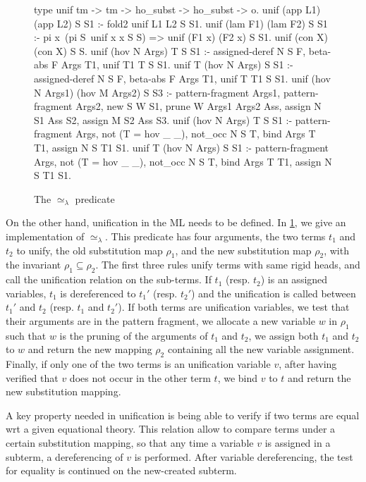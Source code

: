 \documentclass[sigconf,natbib=false]{acmart}
\newcommand{\UnifRel}{\ensuremath{\simeq}}
\newcommand{\Ue}{\ensuremath{\UnifRel_\lambda}\xspace}
\begin{document}
\begin{figure}
  \begin{elpicode}
    type unif tm -> tm -> ho_subst -> ho_subst ->  o.
    unif (app L1) (app L2) S S1 :- fold2 unif L1 L2 S S1.
    unif (lam F1) (lam F2) S S1 :- 
      pi x\ (pi S\ unif x x S S) => unif (F1 x) (F2 x) S S1.
    unif (con X) (con X) S S.
    unif (hov N Args) T S S1 :- 
      assigned-deref N S F, beta-abs F Args T1, unif T1 T S S1.
    unif T (hov N Args) S S1 :- 
      assigned-deref N S F, beta-abs F Args T1, unif T T1 S S1.
    unif (hov N Args1) (hov M Args2) S S3 :-  
      pattern-fragment Args1, pattern-fragment Args2, 
      new S W S1, prune W Args1 Args2 Ass, 
      assign N S1 Ass S2, assign M S2 Ass S3.
    unif (hov N Args) T S S1 :- pattern-fragment Args,
      not (T = hov _ _), not_occ N S T,  
      bind Args T T1, assign N S T1 S1.
    unif T (hov N Args) S S1 :- pattern-fragment Args,
      not (T = hov _ _), not_occ N S T, 
       bind Args T T1, assign N S T1 S1.
  \end{elpicode}
  \caption{The \Ue predicate}
  \label{code:ue-pred}
\end{figure}

On the other hand, unification in the ML needs to be defined. In
\cref{code:ue-pred}, we give an implementation of \Ue. This predicate has four
arguments, the two terms $t_1$ and $t_2$ to unify, the old substitution map
$\rho_1$, and the new substitution map $\rho_2$, with the invariant $\rho_1
\subseteq \rho_2$. The first three rules unify terms with same rigid heads, and
call the unification relation on the sub-terms. If $t_1$ (resp. $t_2$) is an
assigned variables, $t_1$ is dereferenced to $t_1'$ (resp. $t_2'$) and the
unification is called between $t_1'$ and $t_2$ (resp. $t_1$ and $t_2'$). If both
terms are unification variables, we test that their arguments are in the pattern
fragment, we allocate a new variable $w$ in $\rho_1$ such that $w$ is the
pruning of the arguments of $t_1$ and $t_2$, we assign both $t_1$ and $t_2$ to
$w$ and return the new mapping $\rho_2$ containing all the new variable
assignment. Finally, if only one of the two terms is an unification variable
$v$, after having verified that $v$ does not occur in the other term $t$, we
bind $v$ to $t$ and return the new substitution mapping.

\old

A key property needed in unification is being able to verify if two terms are
equal wrt a given equational theory. This relation allow to compare terms under
a certain substitution mapping, so that any time a variable $v$ is assigned in a
subterm, a dereferencing of $v$ is performed. After variable dereferencing, the
test for equality is continued on the new-created subterm.
\end{document}
